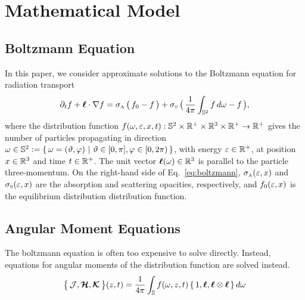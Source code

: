 \section{Mathematical Model}

\subsection{Boltzmann Equation}

In this paper, we consider approximate solutions to the Boltzmann equation for radiation transport
\begin{equation}
  \pd{f}{t}+\vect{\ell}\cdot\nabla f
  =\sigma_{\Ab}\,\big(\,f_{0}-f\,\big)
  +\sigma_{\Scatt}\,\big(\,\f{1}{4\pi}\int_{\bbS^{2}}f\,d\omegaNu-f\,\big),
  \label{eq:boltzmann}
\end{equation}
where the distribution function $f(\omega,\varepsilon,x,t):\mathbb{S}^{2}\times\mathbb{R}^{+}\times\mathbb{R}^{3}\times\mathbb{R}^{+}\to\mathbb{R}^{+}$ gives the number of particles propagating in direction $\omega\in\mathbb{S}^{2}:=\{\,\omega=(\vartheta,\varphi)~|~\vartheta\in[0,\pi],\varphi\in[0,2\pi)\,\}$, with energy $\varepsilon\in\mathbb{R}^{+}$, at position $x\in\mathbb{R}^{3}$ and time $t\in\mathbb{R}^{+}$.  
The unit vector $\boldsymbol{\ell}(\omega)\in\mathbb{R}^{3}$ is parallel to the particle three-momentum.  
On the right-hand side of Eq.~\eqref{eq:boltzmann}, $\sigma_{\mbox{\tiny A}}(\varepsilon,x)$ and $\sigma_{\mbox{\tiny S}}(\varepsilon,x)$ are the absorption and scattering opacities, respectively, and $f_{0}(\varepsilon,x)$ is the equilibrium distribution distribution function.  

\subsection{Angular Moment Equations}

The boltzmann equation is often too expensive to solve directly.  
Instead, equations for angular moments of the distribution function are solved instead.  
\begin{equation}
  \big\{\,\mathcal{J},\boldsymbol{\mathcal{H}},\boldsymbol{\mathcal{K}}\,\big\}(z,t)=\frac{1}{4\pi}\int_{\mathbb{S}}f(\omega,z,t)\,\{\,1,\boldsymbol{\ell},\boldsymbol{\ell}\otimes\boldsymbol{\ell}\,\}\,d\omega
\end{equation}